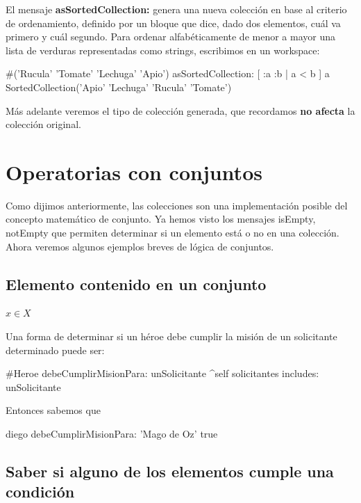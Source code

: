 \documentclass[a4paper,12pt]{book}
\begin{document}
El mensaje \textbf{asSortedCollection:} genera una nueva colección en base al criterio de ordenamiento, definido
por un bloque que dice, dado dos elementos, cuál va primero y cuál segundo. Para ordenar alfabéticamente
de menor a mayor una lista de verduras representadas como strings, escribimos en un workspace: 

\begin{code}
#('Rucula' 'Tomate' 'Lechuga' 'Apio') asSortedCollection: [ :a :b | a < b ]
    a SortedCollection('Apio' 'Lechuga' 'Rucula' 'Tomate')
\end{code}

Más adelante veremos el tipo de colección generada, que recordamos \textbf{no afecta} la colección original.

\section{Operatorias con conjuntos}

Como dijimos anteriormente, las colecciones son una implementación posible del concepto matemático de conjunto.
Ya hemos visto los mensajes isEmpty, notEmpty que permiten determinar si un elemento está o no en una colección.
Ahora veremos algunos ejemplos breves de lógica de conjuntos.

\subsection{Elemento contenido en un conjunto}

\begin{mdframed}[style=BoxFrame]
\( x \in X \)
\end{mdframed}
 
Una forma de determinar si un héroe debe cumplir la misión de un solicitante determinado puede ser:

\begin{code}
#Heroe
debeCumplirMisionPara: unSolicitante
    ^self solicitantes includes: unSolicitante
\end{code}

Entonces sabemos que

\begin{code}
diego debeCumplirMisionPara: 'Mago de Oz'
    true
\end{code}

\subsection{Saber si alguno de los elementos cumple una condición}
\end{document}
